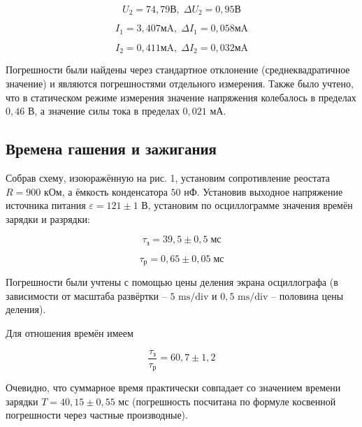 \documentclass[a4paper, 12pt]{article}%
\begin{document}
\begin{equation}
    U_2 = 74,79 \text{В}, \; \Delta  U_2 = 0,95 \text{В}
\end{equation}

\begin{equation}
    I_1 = 3,407 \text{мA}, \; \Delta  I_1 = 0,058 \text{мA}
\end{equation}

\begin{equation}
    I_2 = 0,411 \text{мA}, \; \Delta  I_2 = 0,032 \text{мA}
\end{equation}

Погрешности были найдены через стандартное отклонение (среднеквадратичное значение) и являются погрешностями отдельного измерения. Также было учтено, что в статическом режиме измерения значение напряжения колебалось в пределах $0,46$ В, а значение силы тока в пределах $0,021$ мА.

\subsection{Времена гашения и зажигания}

Собрав схему, изоюражённую на рис. 1, установим сопротивление реостата $R = 900$ кОм, а ёмкость конденсатора $50$ нФ. Установив выходное напряжение источника питания $\varepsilon = 121 \pm 1$ В, установим по осциллограмме значения времён зарядки и разрядки:

\begin{equation}
    \tau_{\text{з}} = 39,5 \pm 0,5 \; \text{мс}
\end{equation}

\begin{equation}
    \tau_{\text{р}} = 0,65 \pm 0,05 \; \text{мс}
\end{equation}

Погрешности были учтены с помощью цены деления экрана осциллографа (в зависимости от масштаба развёртки -- $5$ $\text{ms/div}$ и $0,5$ $\text{ms/div}$ -- половина цены деления).

Для отношения времён имеем

\begin{equation}
    \frac{\tau_{\text{з}}}{\tau_{\text{р}}} = 60,7 \pm 1,2
\end{equation}

Очевидно, что суммарное время практически совпадает со значением времени зарядки $T = 40,15 \pm 0,55$ мс (погрешность посчитана по формуле косвенной погрешности через частные производные).
\end{document}

